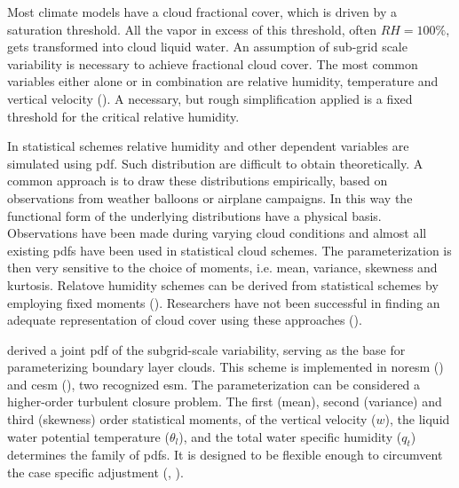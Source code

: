 Most climate models have a cloud fractional cover, which is driven by a saturation threshold. All the vapor in excess of this threshold, often $RH=100\%$, gets transformed into cloud liquid water. An assumption of sub-grid scale variability is necessary to achieve fractional cloud cover. %
The most common variables either alone or in combination are relative humidity, temperature and vertical velocity (\cite{Golaz2002_part1}). A necessary, but rough simplification applied is a fixed threshold for the critical relative humidity. 

In statistical schemes relative humidity and other dependent variables are simulated using \acrfull{pdf}. Such distribution are difficult to obtain theoretically. A common approach is to draw these distributions empirically, based on observations from weather balloons or airplane campaigns. In this way the functional form of the underlying distributions have a physical basis. Observations have been made during varying cloud conditions and almost all existing \acrshort{pdf}s have been used in statistical cloud schemes. The parameterization is then very sensitive to the choice of moments, i.e. mean, variance, skewness and kurtosis. Relatove humidity schemes can be derived from statistical schemes by employing fixed moments (\cite{Tomkins2005}). Researchers have not been successful in finding an adequate representation of cloud cover using these approaches (\cite{Tompkins2009CloudParametrization}). 

 derived a joint \acrshort{pdf} of the subgrid-scale variability, serving as the base for parameterizing boundary layer clouds. This scheme is implemented in \acrfull{noresm} (\cite{SelandNORESM}) and \acrfull{cesm} (\cite{DanabasogluCESM}), two recognized \acrshort{esm}. The parameterization can be considered a higher-order turbulent closure problem. The first (mean), second (variance) and third (skewness) order statistical moments, of the vertical velocity ($w$), the liquid water potential temperature ($\theta_l$), and the total water specific humidity ($q_t$) determines the family of \acrshort{pdf}s. It is designed to be flexible enough to 
circumvent the case specific adjustment (\cite{Golaz2002_part1}, \cite{Golaz2002_part2}). 

